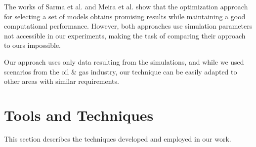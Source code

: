 \documentclass[final,5p,times,twocolumn]{elsarticle}
\begin{document}
The works of Sarma et al. \cite{selection-sarma:2013} and Meira et al. \cite{meira:2016} show that the optimization approach for selecting a set of models obtains promising results while maintaining a good computational performance. However, both approaches use simulation parameters not accessible in our experiments, making the task of comparing their approach to ours impossible.

Our approach uses only data resulting from the simulations, and while we used scenarios from the oil \& gas industry, our technique can be easily adapted to other areas with similar requirements.




\section{Tools and Techniques}
\label{sec:tools}
This section describes the techniques developed and employed in our work.
\end{document}
